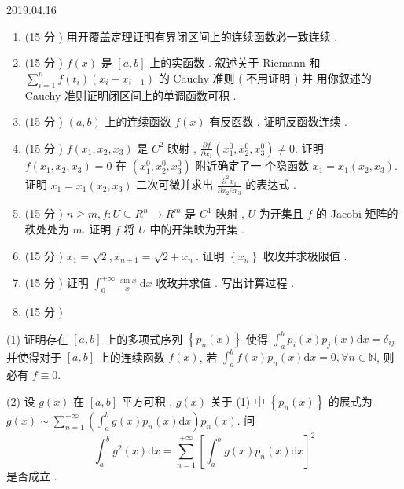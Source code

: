 \documentclass[10pt]{article}
\begin{document}
2019.04.16

\begin{enumerate}
  \item (15  分 )  用开覆盖定理证明有界闭区间上的连续函数必一致连续 .

  \item (15  分 ) $f(x)$  是  $[a, b]$  上的实函数 .  叙述关于  Riemann  和  $\sum_{i=1}^{n} f\left(t_{i}\right)\left(x_{i}-x_{i-1}\right)$  的  Cauchy  准则  ( 不用证明 )  并   用你叙述的  Cauchy  准则证明闭区间上的单调函数可积 .

  \item (15  分 ) $(a, b)$  上的连续函数  $f(x)$  有反函数 .  证明反函数连续 .

  \item (15  分 ) $f\left(x_{1}, x_{2}, x_{3}\right)$  是  $C^{2}$  映射 , $\frac{\partial f}{\partial x_{1}}\left(x_{1}^{0}, x_{2}^{0}, x_{3}^{0}\right) \neq 0$.  证明  $f\left(x_{1}, x_{2}, x_{3}\right)=0$  在  $\left(x_{1}^{0}, x_{2}^{0}, x_{3}^{0}\right)$  附近确定了一   个隐函数  $x_{1}=x_{1}\left(x_{2}, x_{3}\right)$.  证明  $x_{1}=x_{1}\left(x_{2}, x_{3}\right)$  二次可微并求出  $\frac{\partial^{2} x_{1}}{\partial x_{2} \partial x_{3}}$  的表达式 .

  \item (15  分 ) $n \geqslant m, f: U \subseteq R^{n} \rightarrow R^{m}$  是  $C^{1}$  映射 , $U$  为开集且  $f$  的  Jacobi  矩阵的秩处处为  $m$.  证明  $f$  将  $U$  中的开集映为开集 .

  \item (15  分 ) $x_{1}=\sqrt{2}, x_{n+1}=\sqrt{2+x_{n}}$.  证明  $\left\{x_{n}\right\}$  收玫并求极限值 .

  \item (15  分 )  证明  $\int_{0}^{+\infty} \frac{\sin x}{x} \mathrm{~d} x$  收玫并求值 .  写出计算过程 .

  \item (15  分 )

\end{enumerate}
(1)  证明存在  $[a, b]$  上的多项式序列  $\left\{p_{n}(x)\right\}$  使得  $\int_{a}^{b} p_{i}(x) p_{j}(x) \mathrm{d} x=\delta_{i j}$  并使得对于  $[a, b]$  上的连续函数  $f(x)$,  若  $\int_{a}^{b} f(x) p_{n}(x) \mathrm{d} x=0, \forall n \in \mathbb{N}$,  则必有  $f \equiv 0$.

(2)  设  $g(x)$  在  $[a, b]$  平方可积 , $g(x)$  关于  (1)  中  $\left\{p_{n}(x)\right\}$  的展式为  $g(x) \sim \sum_{n=1}^{+\infty}\left(\int_{a}^{b} g(x) p_{n}(x) \mathrm{d} x\right) p_{n}(x)$.  问 
$$
\int_{a}^{b} g^{2}(x) \mathrm{d} x=\sum_{n=1}^{+\infty}\left[\int_{a}^{b} g(x) p_{n}(x) \mathrm{d} x\right]^{2}
$$
 是否成立 .
\end{document}
